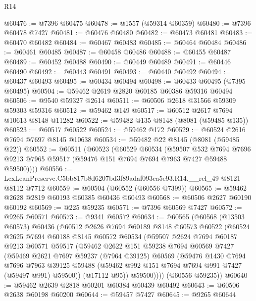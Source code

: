 \begin{lexlean}{R14}
\begin{coremodule}
@60476 := @7396 @60475
@60478 := @1557 (@59314 @60359)
@60480 := @7396 @60478 @7427
@60481 := @60476 @60480
@60482 := @60473 @60481
@60483 := @60470 @60482
@60484 := @60467 @60483
@60485 := @60464 @60484
@60486 := @60461 @60485
@60487 := @60458 @60486
@60488 := @60455 @60487
@60489 := @60452 @60488
@60490 := @60449 @60489
@60491 := @60446 @60490
@60492 := @60443 @60491
@60493 := @60440 @60492
@60494 := @60437 @60493
@60495 := @60434 @60494
@60498 := @60433 @60495 (@7395 @60495)
@60504 := @59462 @2619 @2820 @60185 @60386 @59316 @60494
@60506 := @9540 @59327 @2614
@60511 := @60506 @2618 @31566 @59309 @59303 @59316
@60512 := @59462 @149
@60517 := @60512 @2617 @7694 @10613 @8148 @11282
@60522 := @59482 @135 @8148 (@8081 (@59485 @135))
@60523 := @60517 @60522
@60524 := @59462 @172
@60529 := @60524 @2616 @7694 @7697 @8145 @10638
@60534 := @59482 @22 @8145 (@8081 (@59485 @22))
@60552 := @60511
    (@60523
      (@60529
        @60534
        (@59507
          @532
          @7694
          @7696
          @9213
          @7965
          @59517
          (@59476 @151 @7694 @7694 @7963 @7427 @59488 @59500))))
@60556 := LexLeanPreserve.C5bb817b8d6207bd3f89adaf093ca5e93.R14.__rel_49 @8121 @8112 @7712
@60559 := @60504 (@60552 (@60556 @7399))
@60565 := @59462 @2628 @2819 @60193 @60385 @60436 @60493
@60568 := @60506 @2627 @60190 @60192
@60569 := @225 @59235
@60571 := @7396 @60569 @7427
@60572 := @9265 @60571
@60573 := @9341 @60572
@60634 := @60565
    (@60568
      (@13503 @60573)
      @60436
      (@60512
        @2626
        @7694
        @60189
        @8148
        @60573
        @60522
        (@60524
          @2625
          @7694
          @60188
          @8145
          @60572
          @60534
          (@59507
            @2624
            @7694
            @60187
            @9213
            @60571
            @59517
            (@59462
              @2622
              @151
              @59238
              @7694
              @60569
              @7427
              (@59469
                @2621
                @7697
                @59237
                (@7964 @39125)
                @60569
                (@59476
                  @1430
                  @7694
                  @7696
                  @7963
                  @39125
                  @59488
                  (@59462 @992 @151 @7694 @7694 @991 @7427 (@59497 @991) @59500))
                (@17112 @95))
              @59500))))
      (@60556 @59235))
@60640 := @59462 @2639 @2818 @60201 @60384 @60439 @60492
@60643 := @60506 @2638 @60198 @60200
@60644 := @59457 @7427
@60645 := @9265 @60644

\end{coremodule}
\end{lexlean}
